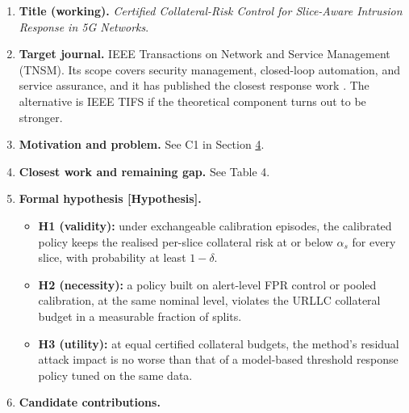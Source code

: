 \begin{enumerate}
\def\labelenumi{\arabic{enumi}.}
\tightlist
\item
  \textbf{Title (working).} \emph{Certified Collateral-Risk Control for
  Slice-Aware Intrusion Response in 5G Networks}.
\item
  \textbf{Target journal.} IEEE Transactions on Network and Service
  Management (TNSM). Its scope covers security management, closed-loop
  automation, and service assurance, and it has published the closest
  response work \citep{hammar2022optimalstopping}. The alternative is
  IEEE TIFS if the theoretical component turns out to be stronger.
\item
  \textbf{Motivation and problem.} See C1 in Section
  \protect\hyperlink{sec:candidates}{4}.
\item
  \textbf{Closest work and remaining gap.} See Table 4.
\item
  \textbf{Formal hypothesis {[}Hypothesis{]}.}

  \begin{itemize}
  \tightlist
  \item
    \textbf{H1 (validity):} under exchangeable calibration episodes, the
    calibrated policy keeps the realised per-slice collateral risk at or
    below \(\alpha_s\) for every slice, with probability at least
    \(1-\delta\).
  \item
    \textbf{H2 (necessity):} a policy built on alert-level FPR control
    or pooled calibration, at the same nominal level, violates the URLLC
    collateral budget in a measurable fraction of splits.
  \item
    \textbf{H3 (utility):} at equal certified collateral budgets, the
    method's residual attack impact is no worse than that of a
    model-based threshold response policy
    \citep{hammar2022optimalstopping} tuned on the same data.
  \end{itemize}
\item
  \textbf{Candidate contributions.}


\end{enumerate}
